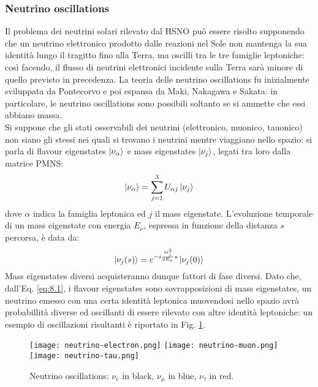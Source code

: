 \subsubsection{Neutrino oscillations}

Il problema dei neutrini solari rilevato dal HSNO può essere risolto supponendo che un neutrino elettronico prodotto dalle reazioni nel Sole non mantenga la sua identità lungo il tragitto fino alla Terra, ma oscilli tra le tre famiglie leptoniche: così facendo, il flusso di neutrini elettronici incidente sulla Terra sarà minore di quello previsto in precedenza. La teoria delle neutrino oscillations fu inizialmente sviluppata da Pontecorvo e poi espansa da Maki, Nakagawa e Sakata: in particolare, le neutrino oscillations sono possibili soltanto se si ammette che essi abbiano massa.\\
Si suppone che gli stati osservabili dei neutrini (elettronico, muonico, tauonico) non siano gli stessi nei quali si trovano i neutrini mentre viaggiano nello spazio: si parla di flavour eigenstates $ \ket{\nu_\alpha} $ e mass eigenstates $ \ket{\nu_j} $, legati tra loro dalla matrice PMNS:
\begin{equation}
	\ket{\nu_{\alpha}} = \sum_{j = 1}^3 U_{\alpha j} \ket{\nu_j}
	\label{eq:8.1}
\end{equation}
dove $ \alpha $ indica la famiglia leptonica ed $ j $ il mass eigenstate. L'evoluzione temporale di un mass eigenstate con energia $ E_{\nu} $, espressa in funzione della distanza $ s $ percorsa, è data da:
\begin{equation}
	\ket{\nu_j(s)} = e^{-i \frac{m_j^2}{2E_{\nu}} s} \ket{\nu_j(0)}
	\label{eq:8.2}
\end{equation}
Mass eigenstates diversi acquisteranno dunque fattori di fase diversi. Dato che, dall'Eq. \ref{eq:8.1}, i flavour eigenstates sono sovrapposizioni di mass eigenstates, un neutrino emesso con una certa identità leptonica muovendosi nello spazio avrà probabillità diverse ed oscillanti di essere rilevato con altre identità leptoniche: un esempio di oscillazioni risultanti è riportato in Fig. \ref{neutrino-oscillations}.

\begin{figure}
	\centering
	\texttt{[image: neutrino-electron.png]}
	\texttt{[image: neutrino-muon.png]}
	\texttt{[image: neutrino-tau.png]}
	\caption{Neutrino oscillations: $ \nu_e $ in black, $ \nu_{\mu} $ in blue, $ \nu_{\tau} $ in red.}
	\label{neutrino-oscillations}
\end{figure}


